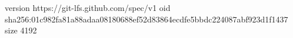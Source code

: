 version https://git-lfs.github.com/spec/v1
oid sha256:01c982fa81a88adaa08180688ef52d83864ecdfe5bbdc224087abf923d1f1437
size 4192
